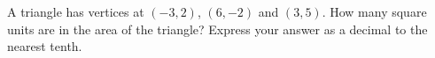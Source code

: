 A triangle has vertices at $(-3,2)$, $(6,-2)$ and $(3,5)$. How many square units are in the area of the triangle? Express your answer as a decimal to the nearest tenth.
